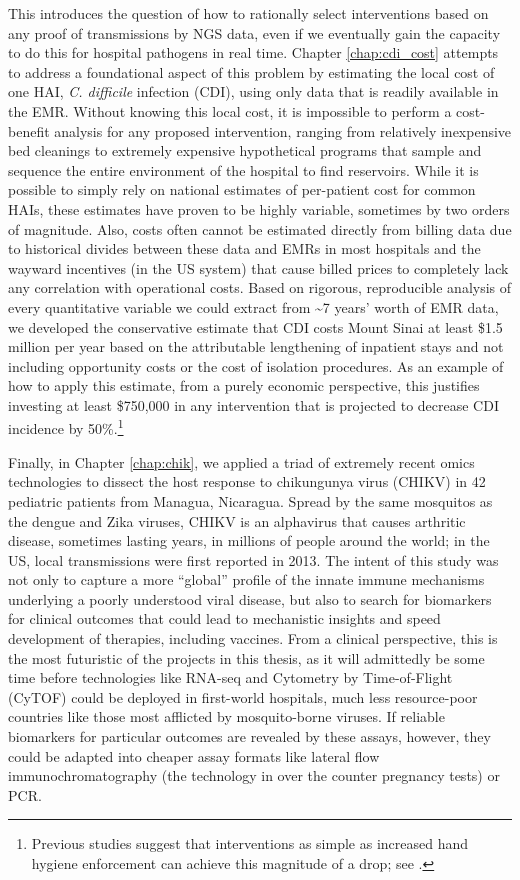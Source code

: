 This introduces the question of how to rationally select interventions based on any proof of transmissions by NGS data, even if we eventually gain the capacity to do this for hospital pathogens in real time. Chapter \ref{chap:cdi_cost} attempts to address a foundational aspect of this problem by estimating the local cost of one HAI, \emph{C. difficile} infection (CDI), using only data that is readily available in the EMR. Without knowing this local cost, it is impossible to perform a cost-benefit analysis for any proposed intervention, ranging from relatively inexpensive bed cleanings to extremely expensive hypothetical programs that sample and sequence the entire environment of the hospital to find reservoirs. While it is possible to simply rely on national estimates of per-patient cost for common HAIs, these estimates have proven to be highly variable, sometimes by two orders of magnitude. Also, costs often cannot be estimated directly from billing data due to historical divides between these data and EMRs in most hospitals and the wayward incentives (in the US system) that cause billed prices to completely lack any correlation with operational costs.\autocite{Cooper2015} Based on rigorous, reproducible analysis of every quantitative variable we could extract from \textasciitilde{}7 years' worth of EMR data, we  developed the conservative estimate that CDI costs Mount Sinai at least \$1.5 million per year based on the attributable lengthening of inpatient stays and not including opportunity costs or the cost of isolation procedures. As an example of how to apply this estimate, from a purely economic perspective, this justifies investing at least \$750,000 in any intervention that is projected to decrease CDI incidence by 50\%.\footnote{Previous studies suggest that interventions as simple as increased hand hygiene enforcement can achieve this magnitude of a drop; see \textcite{Khanafer2015}.}

Finally, in Chapter \ref{chap:chik}, we applied a triad of extremely recent omics technologies to dissect the host response to chikungunya virus (CHIKV) in 42 pediatric patients from Managua, Nicaragua. Spread by the same mosquitos as the dengue and Zika viruses, CHIKV is an alphavirus that causes arthritic disease, sometimes lasting years, in millions of people around the world; in the US, local transmissions were first reported in 2013. The intent of this study was not only to capture a more ``global'' profile of the innate immune mechanisms underlying a poorly understood viral disease, but also to search for biomarkers for clinical outcomes that could lead to mechanistic insights and speed development of therapies, including vaccines. From a clinical perspective, this is the most futuristic of the projects in this thesis, as it will admittedly be some time before technologies like RNA-seq and Cytometry by Time-of-Flight (CyTOF) could be deployed in first-world hospitals, much less resource-poor countries like those most afflicted by mosquito-borne viruses. If reliable biomarkers for particular outcomes are revealed by these assays, however, they could be adapted into cheaper assay formats like lateral flow immunochromatography (the technology in over the counter pregnancy tests) or PCR.

